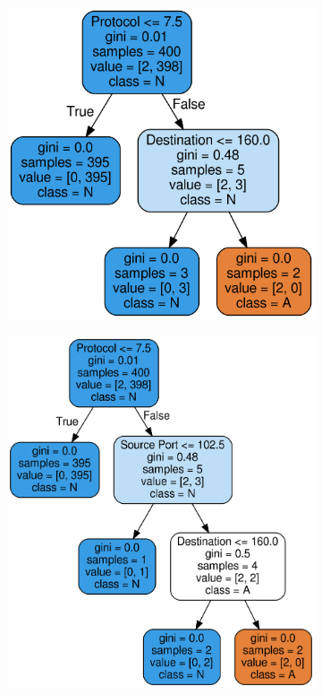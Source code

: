 \documentclass[a4paper,10pt]{article}
\begin{document}
\begin{figure}[!hbp]
\begin{subfigure}{.5\textwidth}
  \caption{}
  \label{fig:sfig2}
\end{subfigure}
\begin{subfigure}{.5\textwidth}
  \centering
  \includegraphics[width=.8\linewidth]{Wireshark/Tres/4.png}
  \caption{}
  \label{fig:sfig2}
\end{subfigure}
\begin{subfigure}{.5\textwidth}
  \centering
  \includegraphics[width=.8\linewidth]{Wireshark/Tres/5.png}
  \caption{}
  \label{fig:sfig2}

\end{subfigure}
\end{figure}
\end{document}

